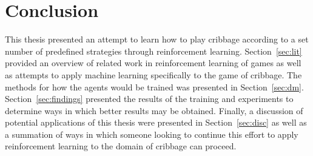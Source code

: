 \section{Conclusion}
\label{sec:conclusion}


This thesis presented an attempt to learn how to play cribbage according
to a set number of predefined strategies through reinforcement learning.
%
Section~\ref{sec:lit} provided an overview of related work in
reinforcement learning of games as well as attempts to apply machine learning
specifically to the game of cribbage.
%
The methods for how the agents would be trained  was presented in
Section~\ref{sec:dm}.
%
Section~\ref{sec:findings}
presented the results of the training and 
experiments to determine ways in which better results may be obtained.
%
Finally,
a discussion of potential applications of this thesis were presented
in Section~\ref{sec:disc}
as well as a summation of ways in which someone looking to continue this effort
to apply reinforcement learning to the domain of cribbage can proceed.

